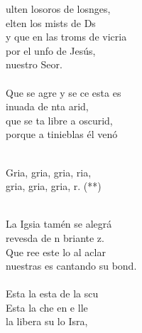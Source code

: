 \begin{cancion}%
	ulten losoros de losnges, \\
	elten los mists de Ds \\
	y que en las troms de vicria\\
	por el unfo de Jesús, \\
	nuestro Seor.\\
\jump\\
	Que se agre y se ce esta es\\
	inuada de nta arid, \\
	que se ta libre a oscurid,\\
	porque a  tinieblas él venó\\\jump\\
	\begin{chorus}%
	Gria, gria, gria, ria,\\
	gria, gria, gria, r. (**)\\
	\end{chorus}%
	\jump\\
	La Igsia tamén se alegrá\\
	revesda de n briante z.\\
	Que ree este lo al aclar\\
	nuestras es cantando su bond.\\
\jump\\
	Esta  la esta de la scu\\
	Esta  la che en e lle  \\
	la libera su lo Isra,\\

\end{cancion}
